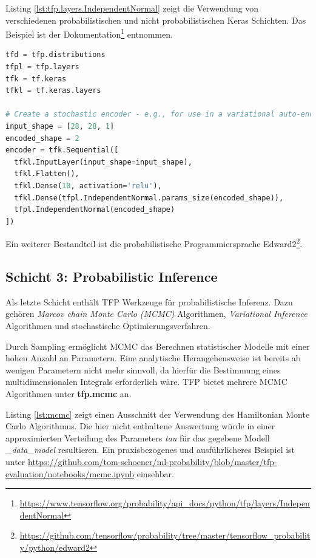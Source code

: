 \documentclass[12pt]{article}
\begin{document}
Listing \ref{lst:tfp.layers.IndependentNormal} zeigt die Verwendung von verschiedenen probabilistischen und nicht probabilistischen Keras Schichten. Das Beispiel ist der Dokumentation\footnote{\url{https://www.tensorflow.org/probability/api_docs/python/tfp/layers/IndependentNormal}} entnommen. 

\begin{lstlisting}[language=Python, caption={Beispiel probabilistischer und nicht probabilistischer Keras Schichten}, label={lst:tfp.layers.IndependentNormal}]
tfd = tfp.distributions
tfpl = tfp.layers
tfk = tf.keras
tfkl = tf.keras.layers

# Create a stochastic encoder - e.g., for use in a variational auto-encoder
input_shape = [28, 28, 1]
encoded_shape = 2
encoder = tfk.Sequential([
  tfkl.InputLayer(input_shape=input_shape),
  tfkl.Flatten(),
  tfkl.Dense(10, activation='relu'),
  tfkl.Dense(tfpl.IndependentNormal.params_size(encoded_shape)),
  tfpl.IndependentNormal(encoded_shape)
])
\end{lstlisting}


Ein weiterer Bestandteil ist die probabilistische Programmiersprache Edward2\footnote{\url{https://github.com/tensorflow/probability/tree/master/tensorflow_probability/python/edward2}}.

\subsection{Schicht 3: Probabilistic Inference}
\label{sec:layer3}
Als letzte Schicht enthält TFP Werkzeuge für probabilistische Inferenz. Dazu gehören \textit{Marcov chain Monte Carlo (MCMC)} Algorithmen, \textit{Variational Inference} Algorithmen und stochastische Optimierungsverfahren. 

Durch Sampling ermöglicht MCMC das Berechnen statistischer Modelle mit einer hohen Anzahl an Parametern. Eine analytische Herangehensweise ist bereits ab wenigen Parametern nicht mehr sinnvoll, da hierfür die Bestimmung eines multidimensionalen Integrals erforderlich wäre. TFP bietet mehrere MCMC Algorithmen unter \textbf{tfp.mcmc} an. 

Listing \ref{lst:mcmc} zeigt einen Ausschnitt der Verwendung des Hamiltonian Monte Carlo Algorithmus. Die hier nicht enthaltene Auswertung würde in einer approximierten Verteilung des Parameters \textit{tau} für das gegebene Modell \textit{\_data\_model} resultieren. Ein praxisbezogenes und ausführlicheres Beispiel ist unter \url{https://github.com/tom-schoener/ml-probability/blob/master/tfp-evaluation/notebooks/mcmc.ipynb} einsehbar.
\end{document}
